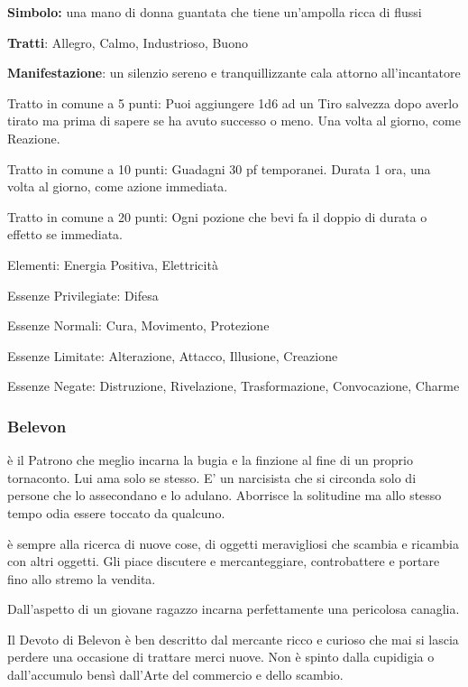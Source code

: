 \documentclass[a4paper,11pt,twoside,openany]{book}
\begin{document}
\textbf{Simbolo:} una mano di donna guantata che tiene un'ampolla ricca di flussi

\textbf{Tratti}: Allegro, Calmo, Industrioso, Buono

\textbf{Manifestazione}: un silenzio sereno e tranquillizzante cala attorno all'incantatore

\bigskip

Tratto in comune a 5 punti: Puoi aggiungere 1d6 ad un Tiro salvezza dopo averlo tirato ma prima di sapere se ha avuto successo o meno. Una volta al giorno, come Reazione.

Tratto in comune a 10 punti: Guadagni 30 pf temporanei. Durata 1 ora, una volta al giorno, come azione immediata.

Tratto in comune a 20 punti: Ogni pozione che bevi fa il doppio di durata o effetto se immediata.

\bigskip

Elementi: Energia Positiva, Elettricità

\bigskip

Essenze Privilegiate: Difesa

Essenze Normali: Cura, Movimento, Protezione

Essenze Limitate: Alterazione, Attacco, Illusione, Creazione

Essenze Negate: Distruzione, Rivelazione, Trasformazione, Convocazione, Charme

\subsubsection{Belevon}

\label{belevon}

è il Patrono che meglio incarna la bugia e la finzione al fine di un proprio tornaconto. Lui ama solo se stesso. E' un narcisista che si circonda solo di persone che lo assecondano e lo adulano. Aborrisce la solitudine ma allo stesso tempo odia essere toccato da qualcuno.

è sempre alla ricerca di nuove cose, di oggetti meravigliosi che scambia e ricambia con altri oggetti. Gli piace discutere e mercanteggiare, controbattere e portare fino allo stremo la vendita.

Dall'aspetto di un giovane ragazzo incarna perfettamente una pericolosa canaglia.

Il Devoto di Belevon è ben descritto dal mercante ricco e curioso che mai si lascia perdere una occasione di trattare merci nuove. Non è spinto dalla cupidigia o dall'accumulo bensì dall'Arte del commercio e dello scambio.
\end{document}
